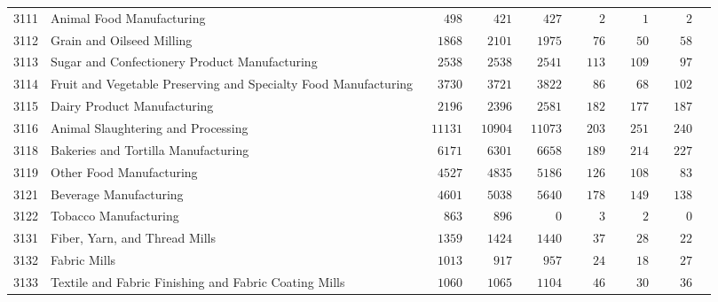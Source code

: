 \documentclass[9pt, oneside]{article}   	%
\begin{document}
\begin{longtable}{lp{3 in}ccccccc}
3111  & Animal Food Manufacturing & $\phantom{000}498$ & $\phantom{000}421$ & $\phantom{000}427$ & $\phantom{0000}2$ & $\phantom{0000}1$ & $\phantom{0000}2$ \\
3112  & Grain and Oilseed Milling & $\phantom{00}1868$ & $\phantom{00}2101$ & $\phantom{00}1975$ & $\phantom{000}76$ & $\phantom{000}50$ & $\phantom{000}58$ \\
3113  & Sugar and Confectionery Product Manufacturing & $\phantom{00}2538$ & $\phantom{00}2538$ & $\phantom{00}2541$ & $\phantom{00}113$ & $\phantom{00}109$ & $\phantom{000}97$ \\
3114  & Fruit and Vegetable Preserving and Specialty Food Manufacturing & $\phantom{00}3730$ & $\phantom{00}3721$ & $\phantom{00}3822$ & $\phantom{000}86$ & $\phantom{000}68$ & $\phantom{00}102$ \\
3115  & Dairy Product Manufacturing & $\phantom{00}2196$ & $\phantom{00}2396$ & $\phantom{00}2581$ & $\phantom{00}182$ & $\phantom{00}177$ & $\phantom{00}187$ \\
3116  & Animal Slaughtering and Processing & $\phantom{0}11131$ & $\phantom{0}10904$ & $\phantom{0}11073$ & $\phantom{00}203$ & $\phantom{00}251$ & $\phantom{00}240$ \\
3118  & Bakeries and Tortilla Manufacturing & $\phantom{00}6171$ & $\phantom{00}6301$ & $\phantom{00}6658$ & $\phantom{00}189$ & $\phantom{00}214$ & $\phantom{00}227$ \\
3119  & Other Food Manufacturing & $\phantom{00}4527$ & $\phantom{00}4835$ & $\phantom{00}5186$ & $\phantom{00}126$ & $\phantom{00}108$ & $\phantom{000}83$ \\
3121  & Beverage Manufacturing & $\phantom{00}4601$ & $\phantom{00}5038$ & $\phantom{00}5640$ & $\phantom{00}178$ & $\phantom{00}149$ & $\phantom{00}138$ \\
3122  & Tobacco Manufacturing & $\phantom{000}863$ & $\phantom{000}896$ & $\phantom{00000}0$ & $\phantom{0000}3$ & $\phantom{0000}2$ & $\phantom{0000}0$ \\
3131  & Fiber, Yarn, and Thread Mills & $\phantom{00}1359$ & $\phantom{00}1424$ & $\phantom{00}1440$ & $\phantom{000}37$ & $\phantom{000}28$ & $\phantom{000}22$ \\
3132  & Fabric Mills & $\phantom{00}1013$ & $\phantom{000}917$ & $\phantom{000}957$ & $\phantom{000}24$ & $\phantom{000}18$ & $\phantom{000}27$ \\
3133  & Textile and Fabric Finishing and Fabric Coating Mills & $\phantom{00}1060$ & $\phantom{00}1065$ & $\phantom{00}1104$ & $\phantom{000}46$ & $\phantom{000}30$ & $\phantom{000}36$ \\

\end{longtable}
\end{document}
